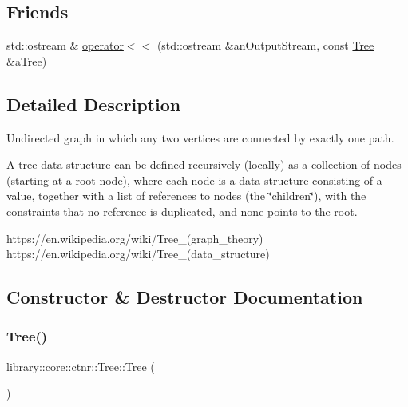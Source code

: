 \subsection*{Friends}
\begin{DoxyCompactItemize}
\item 
std\+::ostream \& \hyperlink{classlibrary_1_1core_1_1ctnr_1_1_tree_aca74cf66509d8f31b83b1c100cb00bea}{operator$<$$<$} (std\+::ostream \&an\+Output\+Stream, const \hyperlink{classlibrary_1_1core_1_1ctnr_1_1_tree}{Tree} \&a\+Tree)
\end{DoxyCompactItemize}


\subsection{Detailed Description}
Undirected graph in which any two vertices are connected by exactly one path. 

A tree data structure can be defined recursively (locally) as a collection of nodes (starting at a root node), where each node is a data structure consisting of a value, together with a list of references to nodes (the \char`\"{}children\char`\"{}), with the constraints that no reference is duplicated, and none points to the root.

https\+://en.wikipedia.\+org/wiki/\+Tree\+\_\+(graph\+\_\+theory) https\+://en.wikipedia.\+org/wiki/\+Tree\+\_\+(data\+\_\+structure) 

\subsection{Constructor \& Destructor Documentation}
\mbox{\label{classlibrary_1_1core_1_1ctnr_1_1_tree_a4bba7cf8925135d1fe4f24fabd07aec4}} 
\subsubsection{\texorpdfstring{Tree()}{Tree()}\hspace{0.1cm}{\footnotesize\ttfamily [1/2]}}
{\footnotesize\ttfamily library\+::core\+::ctnr\+::\+Tree\+::\+Tree (\begin{DoxyParamCaption}{ }\end{DoxyParamCaption})\hspace{0.3cm}{\ttfamily [delete]}}


